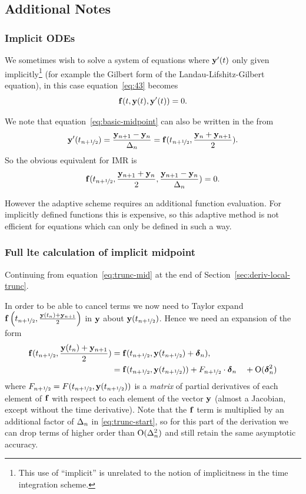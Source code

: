 \subsection{Additional Notes}

\subsubsection{Implicit ODEs}
\label{sec:extens-impl-odes}

We sometimes wish to solve a system of equations where $\mathbf{y}'(t)$ only given implicitly\footnote{This use of ``implicit'' is unrelated to the notion of implicitness in the time integration scheme.} (for example the Gilbert form of the Landau-Lifshitz-Gilbert equation), in this case equation~\eqref{eq:43} becomes
\begin{equation}
  {\mathbf{f}}(t, \mathbf{y}(t), \mathbf{y}'(t)) = 0.
\end{equation}

We note that equation~\eqref{eq:basic-midpoint} can also be written in the from
\begin{equation}
  \mathbf{y}'(t_{n+\nicefrac{1}{2}}) = \frac{\mathbf{y}_{n+1} - \mathbf{y}_n}{\Delta_{n}} =  {\mathbf{f}}(t_{n+\nicefrac{1}{2}}, \frac{\mathbf{y}_n + \mathbf{y}_{n+1}}{2}).
\end{equation}
So the obvious equivalent for IMR is
\begin{equation}
  {\mathbf{f}}(t_{n+\nicefrac{1}{2}}, \frac{\mathbf{y}_{n+1} + \mathbf{y}_n}{2}, \frac{\mathbf{y}_{n+1} - \mathbf{y}_n}{\Delta_{n}}) = 0.
\end{equation}

However the adaptive scheme requires an additional function evaluation.
For implicitly defined functions this is expensive, so this adaptive method is not efficient for equations which can only be defined in such a way.


\subsubsection{Full lte calculation of implicit midpoint}
\label{sec:full-imr-lte-calculation}

Continuing from equation~\eqref{eq:trunc-mid} at the end of Section~\ref{sec:deriv-local-trunc}.

In order to be able to cancel terms we now need to Taylor expand ${\mathbf{f}}\left( t_{n+\nicefrac{1}{2}}, \frac{\mathbf{y}(t_n) + \mathbf{y}_{n+1}}{2} \right)$ in $\mathbf{y}$ about $\mathbf{y}(t_{n+\nicefrac{1}{2}})$.
Hence we need an expansion of the form
\begin{align}
  {\mathbf{f}}(t_{n+\nicefrac{1}{2}}, \frac{\mathbf{y}(t_n) + \mathbf{y}_{n+1}}{2}) &= {\mathbf{f}}(t_{n+\nicefrac{1}{2}}, \mathbf{y}(t_{n+\nicefrac{1}{2}}) + \mbox{\boldmath$\delta$}_{n}),
  \notag \\
  &= {\mathbf{f}}(t_{n+\nicefrac{1}{2}}, \mathbf{y}(t_{n+\nicefrac{1}{2}})) + F_{n+\nicefrac{1}{2}} \cdot \mbox{\boldmath$\delta$}_{n}  \quad + \text{O}(\mbox{\boldmath$\delta$}_{n}^2)
  \label{eq:f-taylor}
\end{align}
where $F_{n+\nicefrac{1}{2}} = F(t_{n+\nicefrac{1}{2}}, \mathbf{y}(t_{n+\nicefrac{1}{2}}))$ is a \emph{matrix} of partial derivatives of each element of ${\mathbf{f}}$ with respect to each element of the vector $\mathbf{y}$ (\ie almost a Jacobian, except without the time derivative).
Note that the ${\mathbf{f}}$ term is multiplied by an additional factor of $\Delta_{n}$ in \eqref{eq:trunc-start}, so for this part of the derivation we can drop terms of higher order than $\text{O}(\Delta_{n}^2)$ and still retain the same asymptotic accuracy.

